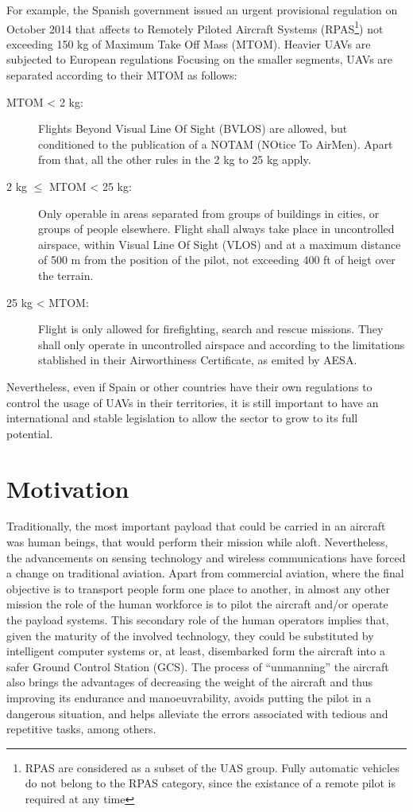 For example, the Spanish government issued an urgent provisional regulation on October 2014 \cite{ley182014de15deoctubredeaprobaciondemedidasurgentesparaelcrecimientolacompetitividadylaeficiencia2014} that affects to Remotely Piloted Aircraft Systems (RPAS\footnote{RPAS are considered as a subset of the UAS group. Fully automatic vehicles do not belong to the RPAS category, since the existance of a remote pilot is required at any time}) not exceeding 150 kg of Maximum Take Off Mass (MTOM). Heavier UAVs are subjected to European regulations \cite{regulationecno21620082008}
Focusing on the smaller segments, UAVs are separated according to their MTOM as follows:
\begin{description}
	\item[MTOM < 2 kg:] Flights Beyond Visual Line Of Sight (BVLOS) are allowed, but conditioned to the publication of a NOTAM (NOtice To AirMen). Apart from that, all the other rules in the 2 kg to 25 kg apply.
	\item[2 kg $\leq$ MTOM < 25 kg:] Only operable in areas separated from groups of buildings in cities, or groups of people elsewhere. Flight shall always take place in uncontrolled airspace, within Visual Line Of Sight (VLOS) and at a maximum distance of 500 m from the position of the pilot, not exceeding 400 ft of heigt over the terrain.
	\item[25 kg < MTOM:] Flight is only allowed for firefighting, search and rescue missions. They shall only operate in uncontrolled airspace and according to the limitations stablished in their Airworthiness Certificate, as emited by AESA.
\end{description}
Nevertheless, even if Spain or other countries have their own regulations to control the usage of UAVs in their territories, it is still important to have an international and stable legislation to allow the sector to grow to its full potential.


\section{Motivation}\label{sec:motivation}

Traditionally, the most important payload that could be carried in an aircraft was human beings, that would perform their mission while aloft.
Nevertheless, the advancements on sensing technology and wireless communications have forced a change on traditional aviation.
Apart from commercial aviation, where the final objective is to transport people form one place to another, in almost any other mission the role of the human workforce is to pilot the aircraft and/or operate the payload systems.
This secondary role of the human operators implies that, given the maturity of the involved technology, they could be substituted by intelligent computer systems or, at least, disembarked form the aircraft into a safer Ground Control Station (GCS).
The process of ``unmanning'' the aircraft also brings the advantages of decreasing the weight of the aircraft and thus improving its endurance and manoeuvrability, avoids putting the pilot in a dangerous situation, and helps alleviate the errors associated with tedious and repetitive tasks, among others.


